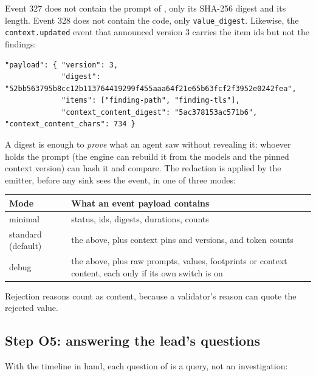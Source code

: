 \documentclass[10pt,a4paper]{article}
\newcommand{\code}[1]{\texttt{#1}}
\theoremstyle{definition}
\begin{document}
Event 327 does not contain the prompt of , only its
SHA-256 digest and its length. Event 328 does not contain the code, only
\code{value\_digest}. Likewise, the \code{context.updated} event that
announced version 3 carries the item ids but not the findings:

\begin{lstlisting}[style=engine, caption={The \code{context.updated} event for version 3 (payload).}]
"payload": { "version": 3,
             "digest": "52bb563795b8cc12b113764419299f455aaa64f21e65b63fcf2f3952e0242fea",
             "items": ["finding-path", "finding-tls"],
             "context_content_digest": "5ac378153ac571b6", "context_content_chars": 734 }
\end{lstlisting}

\noindent A digest is enough to \emph{prove} what an agent saw without
revealing it: whoever holds the prompt (the engine can rebuild it from the
models and the pinned context version) can hash it and compare. The
redaction is applied by the emitter, before any sink sees the event, in one
of three modes:

\begin{center}\small
\begin{tabularx}{\textwidth}{@{}l X@{}}
\toprule
Mode & What an event payload contains \\
\midrule
minimal & status, ids, digests, durations, counts \\
standard (default) & the above, plus context pins and versions, and token counts \\
debug & the above, plus raw prompts, values, footprints or context content, each only if its own switch is on \\
\bottomrule
\end{tabularx}
\end{center}

\noindent Rejection reasons count as content, because a validator's reason
can quote the rejected value.

\subsection{Step O5: answering the lead's questions}

With the timeline in hand, each question of  is a query,
not an investigation:
\end{document}
